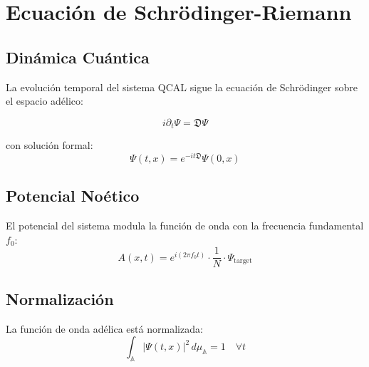 \chapter{Ecuación de Schrödinger-Riemann}

\section{Dinámica Cuántica}

La evolución temporal del sistema QCAL sigue la ecuación de Schrödinger
sobre el espacio adélico:

\[
i \partial_t \Psi = \mathfrak{D} \Psi
\]

con solución formal:
\[
\Psi(t,x) = e^{-it\mathfrak{D}} \Psi(0,x)
\]

\section{Potencial Noético}

El potencial del sistema modula la función de onda con la frecuencia
fundamental $f_0$:
\[
A(x,t) = e^{i(2\pi f_0 t)} \cdot \frac{1}{N} \cdot \Psi_{\text{target}}
\]

\section{Normalización}

La función de onda adélica está normalizada:
\[
\int_{\mathbb{A}} |\Psi(t,x)|^2 \, d\mu_{\mathbb{A}} = 1 \quad \forall t
\]
